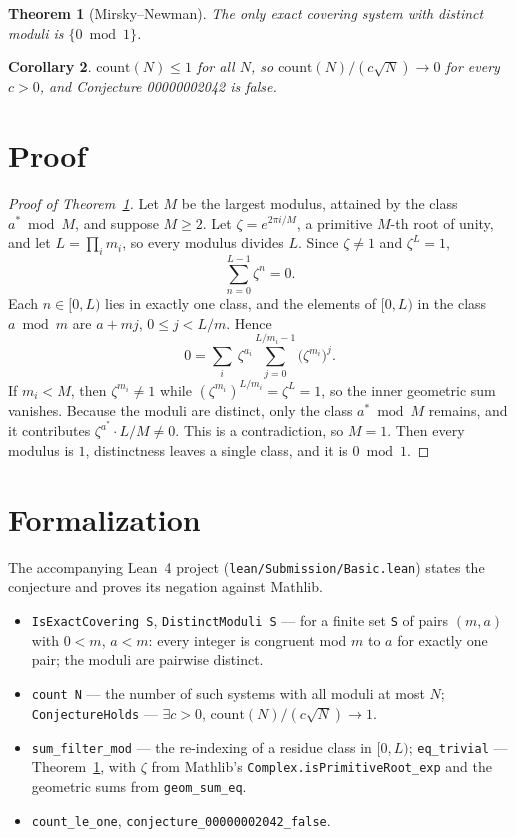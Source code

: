 \documentclass[11pt]{article}
\theoremstyle{plain}
\newtheorem{theorem}{Theorem}
\newtheorem{corollary}[theorem]{Corollary}
\theoremstyle{definition}
\theoremstyle{remark}
\begin{document}
\begin{theorem}[Mirsky--Newman]\label{thm:mn}
The only exact covering system with distinct moduli is $\{0\bmod1\}$.
\end{theorem}

\begin{corollary}
$\mathrm{count}(N)\le1$ for all $N$, so $\mathrm{count}(N)/(c\sqrt N)\to0$ for
every $c>0$, and Conjecture 00000002042 is false.
\end{corollary}

\section{Proof}

\begin{proof}[Proof of Theorem~\ref{thm:mn}]
Let $M$ be the largest modulus, attained by the class $a^\ast\bmod M$, and
suppose $M\ge2$. Let $\zeta=e^{2\pi i/M}$, a primitive $M$-th root of unity, and
let $L=\prod_i m_i$, so every modulus divides $L$. Since $\zeta\ne1$ and
$\zeta^L=1$,
\[
  \sum_{n=0}^{L-1}\zeta^n=0 .
\]
Each $n\in[0,L)$ lies in exactly one class, and the elements of $[0,L)$ in the
class $a\bmod m$ are $a+mj$, $0\le j<L/m$. Hence
\[
  0=\sum_i\ \zeta^{a_i}\sum_{j=0}^{L/m_i-1}\bigl(\zeta^{m_i}\bigr)^j .
\]
If $m_i<M$, then $\zeta^{m_i}\ne1$ while $(\zeta^{m_i})^{L/m_i}=\zeta^L=1$, so the
inner geometric sum vanishes. Because the moduli are distinct, only the class
$a^\ast\bmod M$ remains, and it contributes $\zeta^{a^\ast}\cdot L/M\ne0$. This
is a contradiction, so $M=1$. Then every modulus is $1$, distinctness leaves a
single class, and it is $0\bmod1$.
\end{proof}

\section{Formalization}

The accompanying Lean~4 project (\texttt{lean/Submission/Basic.lean}) states
the conjecture and proves its negation against Mathlib.

\begin{itemize}
  \item \texttt{IsExactCovering S}, \texttt{DistinctModuli S} --- for a finite
    set \texttt{S} of pairs $(m,a)$ with $0<m$, $a<m$: every integer is
    congruent mod $m$ to $a$ for exactly one pair; the moduli are pairwise
    distinct.
  \item \texttt{count N} --- the number of such systems with all moduli at most
    $N$; \texttt{ConjectureHolds} --- $\exists c>0$,
    $\mathrm{count}(N)/(c\sqrt N)\to1$.
  \item \texttt{sum\_filter\_mod} --- the re-indexing of a residue class in
    $[0,L)$; \texttt{eq\_trivial} --- Theorem~\ref{thm:mn}, with $\zeta$ from
    Mathlib's \texttt{Complex.isPrimitiveRoot\_exp} and the geometric sums
    from \texttt{geom\_sum\_eq}.
  \item \texttt{count\_le\_one}, \texttt{conjecture\_00000002042\_false}.
\end{itemize}
\end{document}
